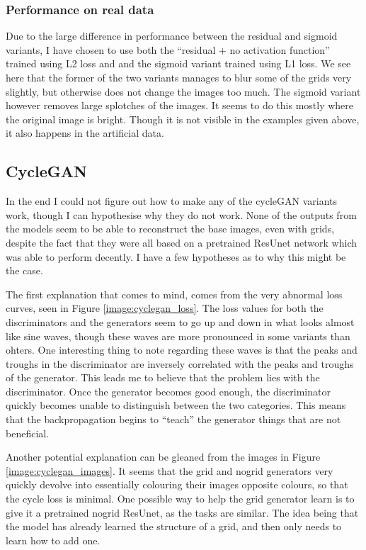 \subsubsection{Performance on real data}
Due to the large difference in performance between the residual and sigmoid variants, I have chosen to use both the ``residual + no activation function'' trained using L2 loss and and the sigmoid variant trained using L1 loss. We see here that the former of the two variants manages to blur some of the grids very slightly, but otherwise does not change the images too much. The sigmoid variant however removes large splotches of the images. It seems to do this mostly where the original image is bright. Though it is not visible in the examples given above, it also happens in the artificial data.

\subsection{CycleGAN}
In the end I could not figure out how to make any of the cycleGAN variants work, though I can hypothesise why they do not work. None of the outputs from the models seem to be able to reconstruct the base images, even with grids, despite the fact that they were all based on a pretrained ResUnet network which was able to perform decently. I have a few hypotheses as to why this might be the case.

The first explanation that comes to mind, comes from the very abnormal loss curves, seen in Figure \ref{image:cyclegan_loss}. The loss values for both the discriminators and the generators seem to go up and down in what looks almost like sine waves, though these waves are more pronounced in some variants than ohters. One interesting thing to note regarding these waves is that the peaks and troughs in the discriminator are inversely correlated with the peaks and troughs of the generator. This leads me to believe that the problem lies with the discriminator. Once the generator becomes good enough, the discriminator quickly becomes unable to distinguish between the two categories. This means that the backpropagation begins to ``teach'' the generator things that are not beneficial.

Another potential explanation can be gleaned from the images in Figure \ref{image:cyclegan_images}. It seems that the grid and nogrid generators very quickly devolve into essentially colouring their images opposite colours, so that the cycle loss is minimal. One possible way to help the grid generator learn is to give it a pretrained nogrid ResUnet, as the tasks are similar. The idea being that the model has already learned the structure of a grid, and then only needs to learn how to add one.

